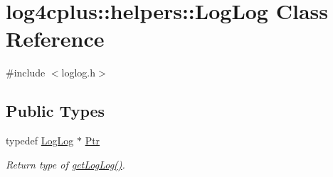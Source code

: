 \hypertarget{classlog4cplus_1_1helpers_1_1LogLog}{\section{log4cplus\-:\-:helpers\-:\-:Log\-Log Class Reference}
\label{classlog4cplus_1_1helpers_1_1LogLog}
}


{\ttfamily \#include $<$loglog.\-h$>$}

\subsection*{Public Types}
\begin{DoxyCompactItemize}
\item 
typedef \hyperlink{classlog4cplus_1_1helpers_1_1LogLog}{Log\-Log} $\ast$ \hyperlink{classlog4cplus_1_1helpers_1_1LogLog_ac7b386006c89f28eed8c03a86311d75a}{Ptr}
\begin{DoxyCompactList}\small\item\em Return type of \hyperlink{classlog4cplus_1_1helpers_1_1LogLog_a1c24d00722bb900ca23f24a0481d03ab}{get\-Log\-Log()}. \end{DoxyCompactList}\end{DoxyCompactItemize}
